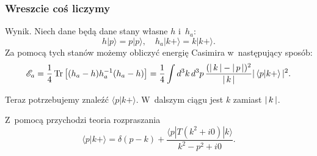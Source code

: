 \documentclass[10pt,t]{beamer}
\begin{document}
\begin{frame}
  \frametitle{Wreszcie coś liczymy}


  Wynik. Niech dane będą dane stany własne $h$ i~$h_{ a }$:
  \begin{equation}
    \label{eq:Efekt-Casimira-23}
    h | p \rangle = p | p \rangle, \quad
    h_{ a } | k+ \rangle = k | k+ \rangle.
  \end{equation}
    Za pomocą tych stanów możemy obliczyć energię Casimira
    w~następujący sposób:
    \begin{equation}
      \label{eq:Efekt-Casimira-24}
      \mathcal{E}_{ a } =
      \frac{ 1 }{ 4 } \operatorname{Tr}\left[ ( h_{ a } - h ) h_{ a }^{ -1 }
        ( h_{ a } - h ) \right]
      =
      \frac{ 1 }{ 4 } \int\limits d^{ 3 } k \, d^{ 3 } p \,
      \frac{ ( |\, {  k  } \,| - |\, {  p  } \,| )^{ 2 } }{ |\, {  k  } \,| }
      |\, {  \langle p | k+ \rangle  } \,|^{ 2 }.
    \end{equation}

    Teraz potrzebujemy znaleźć $\langle p | k+ \rangle$. W~dalszym
    ciągu jest $k$ zamiast $|\, {  k  } \,|$.

    Z~pomocą przychodzi teoria rozpraszania
    \begin{equation}
      \label{eq:Efekt-Casimira-25}
      \langle p | k + \rangle =
      \delta(p - k)
      + \frac{ \langle p | T( k^{ 2 } + i0 ) | k \rangle}{ k^{ 2 } - p^{ 2 } + i0 }.
    \end{equation}

\end{frame}
\end{document}
